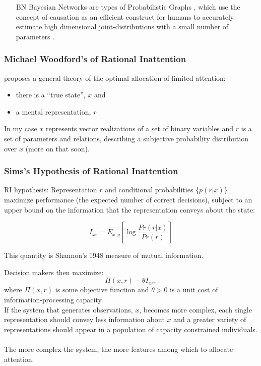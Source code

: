 \documentclass{beamer}
\begin{document}
\begin{frame}
\begin{itemize}
\item[BN] Bayesian Networks are types of Probabilistic Graphs \citep{Koller03}, which use the concept of causation \citep{Verma90} as an efficient construct for humans to accurately estimate high dimensional joint-distributions with a small number of parameters \citep{Griffith08}.
\end{itemize}
\end{frame}
\begin{frame}
\frametitle{Michael Woodford's of Rational Inattention}
\citet{Sims98, Sims03, Sims11} proposes a general theory of the optimal allocation of limited attention: 
\begin{itemize}
\item there is a ``true state'', $x$ and 
\item a mental representation, $r$
\end{itemize} 
In my case $x$ represents vector realizations of a set of binary variables and $r$ is a set of parameters and relations, describing a subjective probability distribution over $x$ (more on that soon). 
\end{frame}
\begin{frame}
\frametitle{Sims's Hypothesis of Rational Inattention}
RI hypothesis:
Representation $r$ and conditional probabilities $\{p(r|x)\}$ maximize performance (the expected number of correct decisions), subject to an upper bound on the information that the representation conveys about the state:

\begin{equation}
I_{xr}=E_{x, y}\left[ \log{\frac{Pr(r|x)}{Pr(r)}}\right]
\end{equation} 

This quantity is Shannon's 1948 measure of mutual information. 
\end{frame}
\begin{frame}
 Decision makers then maximize:
\begin{equation}
\Pi(x, r) - \theta I_{xr}, 
\end{equation} 
where $\Pi(x, r)$ is some objective function and $\theta > 0$ is a unit cost of information-processing capacity.
\\

If the system that generates observations, $x$, becomes more complex, each single representation should convey less information about $x$ and a greater variety of representations should appear in a population of capacity constrained individuals. \\
\\

The more complex the system, the more features among which to allocate attention.    
\end{frame}
\end{document}
